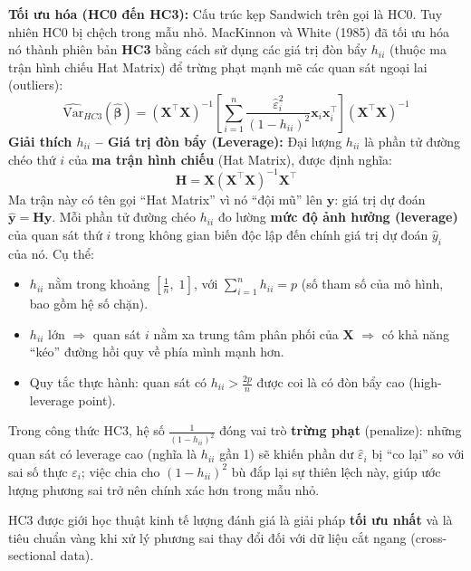 	\textbf{Tối ưu hóa (HC0 đến HC3):}
	Cấu trúc kẹp Sandwich trên gọi là HC0. Tuy nhiên HC0 bị chệch trong mẫu nhỏ. MacKinnon và White (1985) \cite{mackinnon1985} đã tối ưu hóa nó thành phiên bản \textbf{HC3} bằng cách sử dụng các giá trị đòn bẩy $h_{ii}$ (thuộc ma trận hình chiếu Hat Matrix) để trừng phạt mạnh mẽ các quan sát ngoại lai (outliers):
	\begin{equation}
		\widehat{\text{Var}}_{HC3}(\hat{\boldsymbol{\beta}}) = (\mathbf{X}^{\top}\mathbf{X})^{-1} \left[\sum_{i=1}^{n} \frac{\hat{\varepsilon}_i^2}{(1-h_{ii})^2} \mathbf{x}_i\mathbf{x}_i^{\top}\right] (\mathbf{X}^{\top}\mathbf{X})^{-1}
	\end{equation}
	\textbf{Giải thích $h_{ii}$ -- Giá trị đòn bẩy (Leverage):}
	Đại lượng $h_{ii}$ là phần tử đường chéo thứ $i$ của \textbf{ma trận hình chiếu} (Hat Matrix), được định nghĩa:
	\begin{equation}
		\mathbf{H} = \mathbf{X}(\mathbf{X}^{\top}\mathbf{X})^{-1}\mathbf{X}^{\top}
	\end{equation}
	Ma trận này có tên gọi ``Hat Matrix'' vì nó ``đội mũ'' lên $\mathbf{y}$: giá trị dự đoán $\hat{\mathbf{y}} = \mathbf{H}\mathbf{y}$. Mỗi phần tử đường chéo $h_{ii}$ đo lường \textbf{mức độ ảnh hưởng (leverage)} của quan sát thứ $i$ trong không gian biến độc lập đến chính giá trị dự đoán $\hat{y}_i$ của nó. Cụ thể:
	\begin{itemize}
		\item $h_{ii}$ nằm trong khoảng $\left[\frac{1}{n},\; 1\right]$, với $\sum_{i=1}^n h_{ii} = p$ (số tham số của mô hình, bao gồm hệ số chặn).
		\item $h_{ii}$ lớn $\Rightarrow$ quan sát $i$ nằm xa trung tâm phân phối của $\mathbf{X}$ $\Rightarrow$ có khả năng ``kéo'' đường hồi quy về phía mình mạnh hơn.
		\item Quy tắc thực hành: quan sát có $h_{ii} > \frac{2p}{n}$ được coi là có đòn bẩy cao (high-leverage point).
	\end{itemize}
	Trong công thức HC3, hệ số $\frac{1}{(1-h_{ii})^2}$ đóng vai trò \textbf{trừng phạt} (penalize): những quan sát có leverage cao (nghĩa là $h_{ii}$ gần 1) sẽ khiến phần dư $\hat{\varepsilon}_i$ bị ``co lại'' so với sai số thực $\varepsilon_i$; việc chia cho $(1-h_{ii})^2$ bù đắp lại sự thiên lệch này, giúp ước lượng phương sai trở nên chính xác hơn trong mẫu nhỏ.

	HC3 được giới học thuật kinh tế lượng đánh giá là giải pháp \textbf{tối ưu nhất} và là tiêu chuẩn vàng khi xử lý phương sai thay đổi đối với dữ liệu cắt ngang (cross-sectional data).
